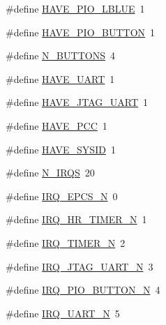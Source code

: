 \begin{DoxyCompactItemize}
\#define \hyperlink{nios2s-db__4ce10_8h_ae2e3972acd7667b5243372b80e27c6c4}{\-H\-A\-V\-E\-\_\-\-P\-I\-O\-\_\-\-L\-B\-L\-U\-E}~1
\item 
\#define \hyperlink{nios2s-db__4ce10_8h_a6f02b8b065d322ead145ed3f53cb43f3}{\-H\-A\-V\-E\-\_\-\-P\-I\-O\-\_\-\-B\-U\-T\-T\-O\-N}~1
\item 
\#define \hyperlink{nios2s-db__4ce10_8h_a271dda243b0f5bd7d2053d258eb71962}{\-N\-\_\-\-B\-U\-T\-T\-O\-N\-S}~4
\item 
\#define \hyperlink{nios2s-db__4ce10_8h_a050edab33688b729046aa35f51eaacd8}{\-H\-A\-V\-E\-\_\-\-U\-A\-R\-T}~1
\item 
\#define \hyperlink{nios2s-db__4ce10_8h_aa4a2ecab034001ed813a80bfcd5377a3}{\-H\-A\-V\-E\-\_\-\-J\-T\-A\-G\-\_\-\-U\-A\-R\-T}~1
\item 
\#define \hyperlink{nios2s-db__4ce10_8h_ac7fe8c276f438abaf08de1f86d68a191}{\-H\-A\-V\-E\-\_\-\-P\-C\-C}~1
\item 
\#define \hyperlink{nios2s-db__4ce10_8h_ab1d56f432cdfc6e0ea1581843a889240}{\-H\-A\-V\-E\-\_\-\-S\-Y\-S\-I\-D}~1
\item 
\#define \hyperlink{nios2s-db__4ce10_8h_ab76079c0049cc06f686c6d134b61fc82}{\-N\-\_\-\-I\-R\-Q\-S}~20
\item 
\#define \hyperlink{nios2s-db__4ce10_8h_ab44bd6f72c0833cf5db37b0245f9d713}{\-I\-R\-Q\-\_\-\-E\-P\-C\-S\-\_\-\-N}~0
\item 
\#define \hyperlink{nios2s-db__4ce10_8h_a5bf7cbd98f23496915dfc65e95b9c27c}{\-I\-R\-Q\-\_\-\-H\-R\-\_\-\-T\-I\-M\-E\-R\-\_\-\-N}~1
\item 
\#define \hyperlink{nios2s-db__4ce10_8h_a61551a457fd728e5f088ea431b553f78}{\-I\-R\-Q\-\_\-\-T\-I\-M\-E\-R\-\_\-\-N}~2
\item 
\#define \hyperlink{nios2s-db__4ce10_8h_ac13cf8ae2cd8c4d11f57dbfa979c6b78}{\-I\-R\-Q\-\_\-\-J\-T\-A\-G\-\_\-\-U\-A\-R\-T\-\_\-\-N}~3
\item 
\#define \hyperlink{nios2s-db__4ce10_8h_ae0705d111695d92747b469c748b5fc8a}{\-I\-R\-Q\-\_\-\-P\-I\-O\-\_\-\-B\-U\-T\-T\-O\-N\-\_\-\-N}~4
\item 
\#define \hyperlink{nios2s-db__4ce10_8h_aaa0ffdfaac63e670b0ef899ce6467773}{\-I\-R\-Q\-\_\-\-U\-A\-R\-T\-\_\-\-N}~5
\end{DoxyCompactItemize}


